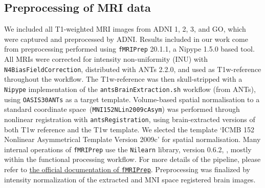\documentclass{article}
\begin{document}
\subsection{Preprocessing of MRI data}\label{apd:preprocessing}
We included all T1-weighted MRI images from ADNI 1, 2, 3, and GO, which were captured and
preprocessed by ADNI. Results included in our work come from preprocessing performed using
\texttt{fMRIPrep} 20.1.1, a Nipype 1.5.0 based tool. All MRIs were corrected for intensity
non-uniformity (INU) with \texttt{N4BiasFieldCorrection}, distributed with ANTs 2.2.0, and used as
T1w-reference throughout the workflow. The T1w-reference was then skull-stripped with a
\texttt{Nipype} implementation of the \texttt{antsBrainExtraction.sh} workflow (from ANTs), using
\texttt{OASIS30ANTs} as a target template.
Volume-based spatial normalisation to a standard coordinate space~(\texttt{MNI152NLin2009cAsym}) was
performed through nonlinear registration with \texttt{antsRegistration}, using brain-extracted
versions of both T1w reference and the T1w template. We slected the template `ICMB 152 Nonlinear
Asymmetrical Template Version 2009c' for spatial normalisation.
Many internal operations of \texttt{fMRIPrep} use the
\texttt{Nilearn} library, version 0.6.2, %
, mostly within the functional processing workflow.
For more details of the pipeline, please refer to
\href{https://fMRIPrep.readthedocs.io/en/latest/workflows.html}{the official documentation of
  \texttt{fMRIPrep}}. Preprocessing was finalized by intensity normalization of the extracted and
MNI space registered brain images.
\end{document}
